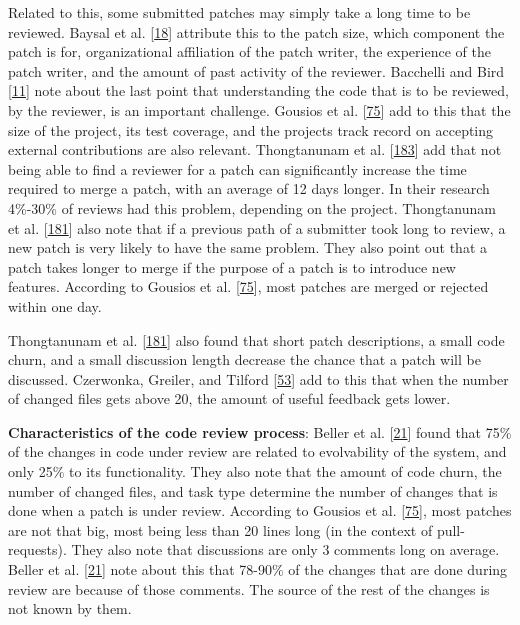 \documentclass[]{book}
\begin{document}
Related to this, some submitted patches may simply take a long time to
be reviewed. Baysal et al.
{[}\protect\hyperlink{ref-baysal2016investigating}{18}{]} attribute this
to the patch size, which component the patch is for, organizational
affiliation of the patch writer, the experience of the patch writer, and
the amount of past activity of the reviewer. Bacchelli and Bird
{[}\protect\hyperlink{ref-bacchelli2013expectations}{11}{]} note about
the last point that understanding the code that is to be reviewed, by
the reviewer, is an important challenge. Gousios et al.
{[}\protect\hyperlink{ref-gousios2014exploratory}{75}{]} add to this
that the size of the project, its test coverage, and the projects track
record on accepting external contributions are also relevant.
Thongtanunam et al.
{[}\protect\hyperlink{ref-thongtanunam2015should}{183}{]} add that not
being able to find a reviewer for a patch can significantly increase the
time required to merge a patch, with an average of 12 days longer. In
their research 4\%-30\% of reviews had this problem, depending on the
project. Thongtanunam et al.
{[}\protect\hyperlink{ref-thongtanunam2017review}{181}{]} also note that
if a previous path of a submitter took long to review, a new patch is
very likely to have the same problem. They also point out that a patch
takes longer to merge if the purpose of a patch is to introduce new
features. According to Gousios et al.
{[}\protect\hyperlink{ref-gousios2014exploratory}{75}{]}, most patches
are merged or rejected within one day.

Thongtanunam et al.
{[}\protect\hyperlink{ref-thongtanunam2017review}{181}{]} also found
that short patch descriptions, a small code churn, and a small
discussion length decrease the chance that a patch will be discussed.
Czerwonka, Greiler, and Tilford
{[}\protect\hyperlink{ref-czerwonka2015code}{53}{]} add to this that
when the number of changed files gets above 20, the amount of useful
feedback gets lower.

\textbf{Characteristics of the code review process}: Beller et al.
{[}\protect\hyperlink{ref-beller2014modern}{21}{]} found that 75\% of
the changes in code under review are related to evolvability of the
system, and only 25\% to its functionality. They also note that the
amount of code churn, the number of changed files, and task type
determine the number of changes that is done when a patch is under
review. According to Gousios et al.
{[}\protect\hyperlink{ref-gousios2014exploratory}{75}{]}, most patches
are not that big, most being less than 20 lines long (in the context of
pull-requests). They also note that discussions are only 3 comments long
on average. Beller et al.
{[}\protect\hyperlink{ref-beller2014modern}{21}{]} note about this that
78-90\% of the changes that are done during review are because of those
comments. The source of the rest of the changes is not known by them.
\end{document}
